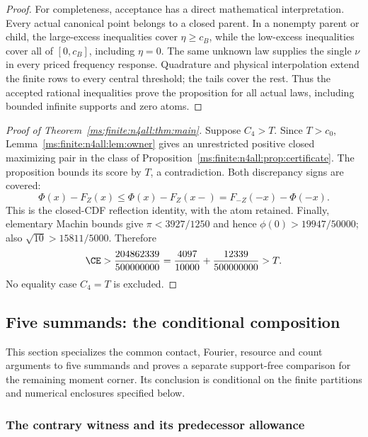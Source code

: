 \begin{proof}
For completeness, acceptance has a direct mathematical interpretation.
Every actual canonical point belongs to a closed parent.
In a nonempty parent or child, the large-excess inequalities cover
$\eta\ge c_B$, while the low-excess inequalities cover all of
$[0,c_B]$, including $\eta=0$. The same unknown law supplies the
single $\nu$ in every priced frequency response. Quadrature and
physical interpolation extend the finite rows to every central
threshold; the tails cover the rest. Thus the accepted rational
inequalities prove the proposition for all actual laws, including
bounded infinite supports and zero atoms.
\end{proof}

\begin{proof}[Proof of Theorem~\ref{ms:finite:n4all:thm:main}]
Suppose $C_4>T$. Since $T>c_0$, Lemma~\ref{ms:finite:n4all:lem:owner} gives
an unrestricted positive closed maximizing pair in the class of
Proposition~\ref{ms:finite:n4all:prop:certificate}. The proposition bounds its
score by $T$, a contradiction. Both discrepancy signs are covered:
\[
 \Phi(x)-F_Z(x)\le\Phi(x)-F_Z(x-)
                     =F_{-Z}(-x)-\Phi(-x).
\]
This is the closed-CDF reflection identity, with the atom retained.
Finally, elementary Machin bounds give $\pi<3927/1250$ and hence
$\phi(0)>19947/50000$; also $\sqrt{10}>15811/5000$. Therefore
\[
 \CE>\frac{204862339}{500000000}
       =\frac{4097}{10000}+\frac{12339}{500000000}>T.
\]
No equality case $C_4=T$ is excluded.
\end{proof}


\subsection{Five summands: the conditional composition}
\label{ms:finite:five:section}

This section specializes the common contact, Fourier, resource and count
arguments to five summands and proves a separate support-free comparison
for the remaining moment corner. Its conclusion is conditional on the finite partitions and numerical
enclosures specified below.

\subsubsection{The contrary witness and its predecessor allowance}


